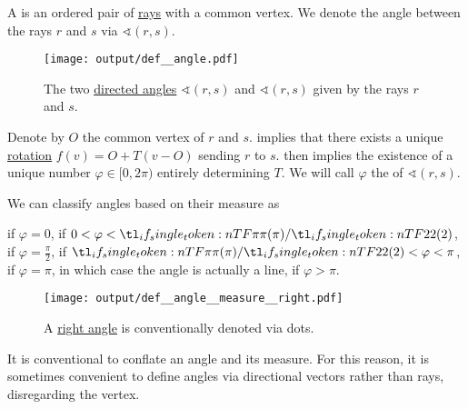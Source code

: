 \begin{definition}\label{def:angle}
  A  is an ordered pair of \hyperref[def:geometric_ray]{rays} with a common vertex. We denote the angle between the rays \( r \) and \( s \) via \( \sphericalangle(r, s) \).

  \begin{figure}[!ht]
    \centering
    \texttt{[image: output/def\_\_angle.pdf]}
    \caption{The two \hyperref[def:angle]{directed angles} \( \sphericalangle(r, s) \) and \( \sphericalangle(r, s) \) given by the rays \( r \) and \( s \).}\label{def:angle/measure/figure}
  \end{figure}

  \begin{thmenum}
     Denote by \( O \) the common vertex of \( r \) and \( s \).  implies that there exists a unique \hyperref[def:rigid_motion/rotation]{rotation} \( f(v) = O + T(v - O) \) sending \( r \) to \( s \).  then implies the existence of a unique number \( \varphi \in [0, 2\pi) \) entirely determining \( T \). We will call \( \varphi \) the  of \( \sphericalangle(r, s) \).

    We can classify angles based on their measure as
    \begin{thmenum}
        if \( \varphi = 0 \),
        if \( 0 < \varphi < \ifrac \pi 2 \),
        if \( \varphi = \tfrac \pi 2 \),
        if \( \ifrac \pi 2 < \varphi < \pi \),
        if \( \varphi = \pi \), in which case the angle is actually a line,
        if \( \varphi > \pi \).
    \end{thmenum}

    \begin{figure}[!ht]
      \centering
      \texttt{[image: output/def\_\_angle\_\_measure\_\_right.pdf]}
      \caption{A \hyperref[def:angle/measure/right]{right angle} is conventionally denoted via dots.}\label{fig:def:angle/measure/right}
    \end{figure}

     It is conventional to conflate an angle and its measure. For this reason, it is sometimes convenient to define angles via directional vectors rather than rays, disregarding the vertex.


\end{thmenum}
\end{definition}
